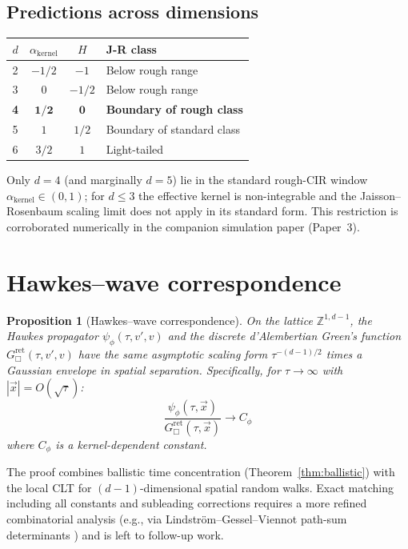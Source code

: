 \documentclass[11pt,a4paper]{article}
\newtheorem{proposition}[theorem]{Proposition}
\begin{document}
\subsection{Predictions across dimensions}

\begin{center}
\begin{tabular}{|c|c|c|l|}
\hline
$d$ & $\alpha_{\mathrm{kernel}}$ & $H$ & J-R class \\
\hline
2 & $-1/2$ & $-1$ & Below rough range \\
3 & $0$ & $-1/2$ & Below rough range \\
\textbf{4} & $\mathbf{1/2}$ & $\mathbf{0}$ & \textbf{Boundary of rough class} \\
5 & $1$ & $1/2$ & Boundary of standard class \\
6 & $3/2$ & $1$ & Light-tailed \\
\hline
\end{tabular}
\end{center}

Only $d=4$ (and marginally $d=5$) lie in the standard rough-CIR window $\alpha_{\mathrm{kernel}} \in (0,1)$; for $d \le 3$ the effective kernel is non-integrable and the Jaisson--Rosenbaum scaling limit does not apply in its standard form. This restriction is corroborated numerically in the companion simulation paper (Paper~3).

\section{Hawkes--wave correspondence}

\begin{proposition}[Hawkes--wave correspondence]
\label{prop:wave}
On the lattice $\mathbb{Z}^{1,d-1}$, the Hawkes propagator $\psi_\phi(\tau, v', v)$ and the discrete d'Alembertian Green's function $G_\Box^{\mathrm{ret}}(\tau, v', v)$ have the same asymptotic scaling form $\tau^{-(d-1)/2}$ times a Gaussian envelope in spatial separation. Specifically, for $\tau \to \infty$ with $|\vec{x}| = O(\sqrt{\tau})$:
\begin{equation}
\frac{\psi_\phi(\tau, \vec{x})}{G_\Box^{\mathrm{ret}}(\tau, \vec{x})} \to C_\phi
\end{equation}
where $C_\phi$ is a kernel-dependent constant.
\end{proposition}

The proof combines ballistic time concentration (Theorem~\ref{thm:ballistic}) with the local CLT for $(d-1)$-dimensional spatial random walks. Exact matching including all constants and subleading corrections requires a more refined combinatorial analysis (e.g., via Lindström--Gessel--Viennot path-sum determinants \cite{Lindstrom1973,GesselViennot1985}) and is left to follow-up work.
\end{document}
